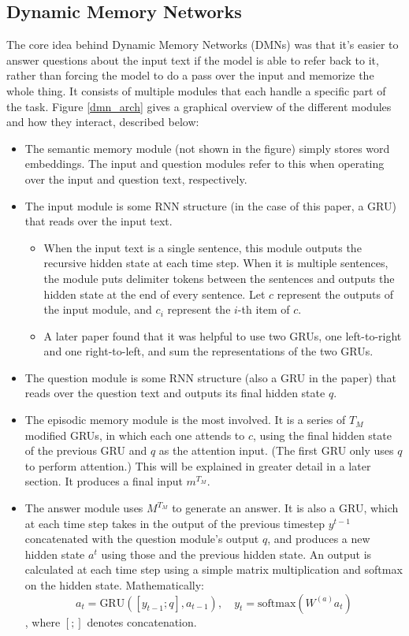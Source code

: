 \subsection{Dynamic Memory Networks}
The core idea behind Dynamic Memory Networks (DMNs) was that it's easier to answer questions about the input text if the model is able to refer back to it, rather than forcing the model to do a pass over the input and memorize the whole thing. It consists of multiple modules that each handle a specific part of the task. Figure \ref{dmn_arch} gives a graphical overview of the different modules and how they interact, described below:
\begin{itemize}
\item The semantic memory module (not shown in the figure) simply stores word embeddings. The input and question modules refer to this when operating over the input and question text, respectively.
\item The input module is some RNN structure (in the case of this paper, a GRU) that reads over the input text. 
\begin{itemize}
\item When the input text is a single sentence, this module outputs the recursive hidden state at each time step. When it is multiple sentences, the module puts delimiter tokens between the sentences and outputs the hidden state at the end of every sentence. Let $c$ represent the outputs of the input module, and $c_i$ represent the $i$-th item of $c$.
\item A later paper found that it was helpful to use two GRUs, one left-to-right and one right-to-left, and sum the representations of the two GRUs.
\end{itemize}
\item The question module is some RNN structure (also a GRU in the paper) that reads over the question text and outputs its final hidden state $q$.
\item The episodic memory module is the most involved. It is a series of $T_M$ modified GRUs, in which each one attends to $c$, using the final hidden state of the previous GRU and $q$ as the attention input. (The first GRU only uses $q$ to perform attention.) This will be explained in greater detail in a later section. It produces a final input $m^{T_M}$.
\item The answer module uses $M^{T_M}$ to generate an answer. It is also a GRU, which at each time step takes in the output of the previous timestep $y^{t-1}$ concatenated with the question module's output $q$, and produces a new hidden state $a^t$ using those and the previous hidden state. An output is calculated at each time step using a simple matrix multiplication and softmax on the hidden state. Mathematically:
$$a_t = \text{GRU}\left(\left[y_{t-1}; q\right], a_{t-1}\right),\quad y_t = \text{softmax}\left(W^{(a)}a_t\right)$$, where $[;]$ denotes concatenation.
\end{itemize}

